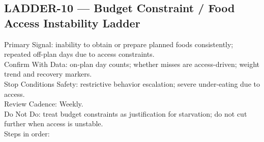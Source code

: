 \documentclass[10pt]{article}
\begin{document}
\newpage

\subsection*{LADDER-10 — Budget Constraint / Food Access Instability Ladder}
{}

Primary Signal: inability to obtain or prepare planned foods consistently; repeated off-plan days due to access constraints.\\
Confirm With Data: on-plan day counts; whether misses are access-driven; weight trend and recovery markers.\\
Stop Conditions Safety: restrictive behavior escalation; severe under-eating due to access.\\
Review Cadence: Weekly.\\
Do Not Do: treat budget constraints as justification for starvation; do not cut further when access is unstable.\\
Steps in order:
\end{document}

